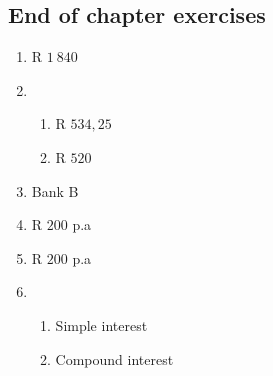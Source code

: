 \begin{enumerate}[label=\textbf{\arabic*}., itemsep=5pt]

\subsection{End of chapter exercises} %
    \begin{enumerate}[label=\textbf{\arabic*}.]
	\item R $1 ~840$%

	\item %
	\begin{enumerate}[noitemsep, label=\textbf{(\alph*)} ]
	    \item R $534,25$%
	    \item R $520$%
	\end{enumerate}

	\item Bank B%

	\item R $200$ p.a%

	\item R $200$ p.a%

	\item %
	\begin{enumerate}[noitemsep, label=\textbf{(\alph*)} ]
	    \item Simple interest%

	    \item Compound interest%
	\end{enumerate}


\end{enumerate}
\end{enumerate}
